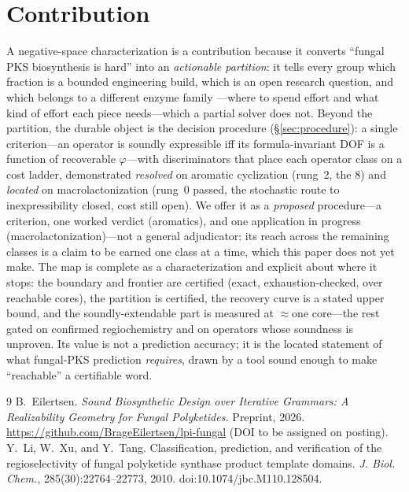 \documentclass[11pt]{article}
\begin{document}
\section{Contribution}
\label{sec:contribution}
A negative-space characterization is a contribution because it converts ``fungal PKS biosynthesis is
hard'' into an \emph{actionable partition}: it tells every group which fraction is a bounded
engineering build, which is an open research question, and which belongs to a different enzyme family
---where to spend effort and what kind of effort each piece needs---which a partial solver does not.
Beyond the partition, the durable object is the decision procedure (\S\ref{sec:procedure}): a single
criterion---an operator is soundly expressible iff its formula-invariant DOF is a function of
recoverable $\varphi$---with discriminators that place each operator class on a cost ladder,
demonstrated \emph{resolved} on aromatic cyclization (rung~2, the $8$) and \emph{located} on
macrolactonization (rung~0 passed, the stochastic route to inexpressibility closed, cost still open).
We offer it as a \emph{proposed} procedure---a criterion, one worked verdict (aromatics), and one
application in progress (macrolactonization)---not a general adjudicator: its reach across the
remaining classes is a claim to be earned one class at a time, which this paper does not yet make.
The map is complete as a characterization and explicit about where it stops: the boundary and frontier
are certified (exact, exhaustion-checked, over reachable cores), the partition is certified, the
recovery curve is a stated upper bound, and the soundly-extendable part is measured at $\approx$one
core---the rest gated on confirmed regiochemistry and on operators whose soundness is unproven.
Its value is not a prediction accuracy; it is the located statement of what fungal-PKS prediction
\emph{requires}, drawn by a tool sound enough to make ``reachable'' a certifiable word.

\begin{thebibliography}{9}\small
{} B.~Eilertsen.
\emph{Sound Biosynthetic Design over Iterative Grammars: A Realizability Geometry for Fungal
Polyketides.} Preprint, 2026. \url{https://github.com/BrageEilertsen/lpi-fungal} (DOI to be assigned
on posting).
 Y.~Li, W.~Xu, and Y.~Tang. Classification, prediction, and
verification of the regioselectivity of fungal polyketide synthase product template domains.
\emph{J. Biol. Chem.}, 285(30):22764--22773, 2010. doi:10.1074/jbc.M110.128504.
\end{thebibliography}
\end{document}
